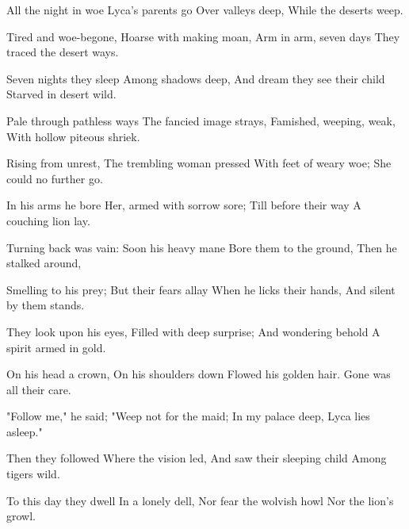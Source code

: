 
\begin{poem}

\begin{stanza}
All the night in woe\verseline
Lyca's parents go\verseline
Over valleys deep,\verseline
While the deserts weep.
\end{stanza}
\begin{stanza}
\verseindent Tired and woe-begone,\verseline
Hoarse with making moan,\verseline
Arm in arm, seven days\verseline
They traced the desert ways.
\end{stanza}
\begin{stanza}
\verseindent Seven nights they sleep\verseline
Among shadows deep,\verseline
And dream they see their child\verseline
Starved in desert wild.
\end{stanza}
\begin{stanza}
\verseindent Pale through pathless ways\verseline
The fancied image strays,\verseline
Famished, weeping, weak,\verseline
With hollow piteous shriek.
\end{stanza}
\begin{stanza}
\verseindent Rising from unrest,\verseline
The trembling woman pressed\verseline
With feet of weary woe;\verseline
She could no further go.
\end{stanza}
\begin{stanza}
\verseindent In his arms he bore\verseline
Her, armed with sorrow sore;\verseline
Till before their way\verseline
A couching lion lay.
\end{stanza}
\begin{stanza}
\verseindent Turning back was vain:\verseline
Soon his heavy mane\verseline
Bore them to the ground,\verseline
Then he stalked around,
\end{stanza}
\begin{stanza}
\verseindent Smelling to his prey;\verseline
But their fears allay\verseline
When he licks their hands,\verseline
And silent by them stands.
\end{stanza}
\begin{stanza}
\verseindent They look upon his eyes,\verseline
Filled with deep surprise;\verseline
And wondering behold\verseline
A spirit armed in gold.
\end{stanza}
\begin{stanza}
\verseindent On his head a crown,\verseline
On his shoulders down\verseline
Flowed his golden hair.\verseline
Gone was all their care.
\end{stanza}
\begin{stanza}
\verseindent "Follow me," he said;\verseline
"Weep not for the maid;\verseline
In my palace deep,\verseline
Lyca lies asleep."
\end{stanza}
\begin{stanza}
\verseindent Then they followed\verseline
Where the vision led,\verseline
And saw their sleeping child\verseline
Among tigers wild.
\end{stanza}
\begin{stanza}
\verseindent To this day they dwell\verseline
In a lonely dell,\verseline
Nor fear the wolvish howl\verseline
Nor the lion's growl.
\end{stanza}

\end{poem}